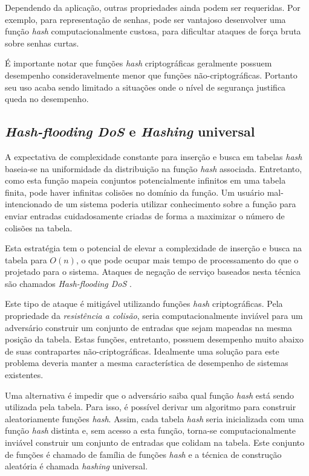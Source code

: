 Dependendo da aplicação, outras propriedades ainda podem ser requeridas. Por exemplo, para representação de senhas, pode ser vantajoso desenvolver uma função \emph{hash} computacionalmente custosa, para dificultar ataques de força bruta sobre senhas curtas.

É importante notar que funções \emph{hash} criptográficas geralmente possuem desempenho consideravelmente menor que funções não-criptográficas. Portanto seu uso acaba sendo limitado a situações onde o nível de segurança justifica queda no desempenho.

\subsection{\emph{Hash-flooding DoS} e \emph{Hashing} universal}

A expectativa de complexidade constante para inserção e busca em tabelas \emph{hash} baseia-se na uniformidade da distribuição na função \emph{hash} associada. Entretanto, como esta função mapeia conjuntos potencialmente infinitos em uma tabela finita, pode haver infinitas colisões no domínio da função. Um usuário mal-intencionado de um sistema poderia utilizar conhecimento sobre a função para enviar entradas cuidadosamente criadas de forma a maximizar o número de colisões na tabela. 

Esta estratégia tem o potencial de elevar a complexidade de inserção e busca na tabela para $O(n)$, o que pode ocupar mais tempo de processamento do que o projetado para o sistema. Ataques de negação de serviço baseados nesta técnica são chamados \emph{Hash-flooding DoS} \cite{klink2011efficient}.

Este tipo de ataque é mitigável utilizando funções \emph{hash} criptográficas. Pela propriedade da \emph{resistência a colisão}, seria computacionalmente inviável para um adversário construir um conjunto de entradas que sejam mapeadas na mesma posição da tabela. Estas funções, entretanto, possuem desempenho muito abaixo de suas contrapartes não-criptográficas. Idealmente uma solução para este problema deveria manter a mesma característica de desempenho de sistemas existentes.

Uma alternativa é impedir que o adversário saiba qual função \emph{hash} está sendo utilizada pela tabela. Para isso, é possível derivar um algoritmo para construir aleatoriamente funções \emph{hash}. Assim, cada tabela \emph{hash} seria inicializada com uma função \emph{hash} distinta e, sem acesso a esta função, torna-se computacionalmente inviável construir um conjunto de entradas que colidam na tabela. Este conjunto de funções é chamado de família de funções \emph{hash} e a técnica de construção aleatória é chamada \emph{hashing} universal.

